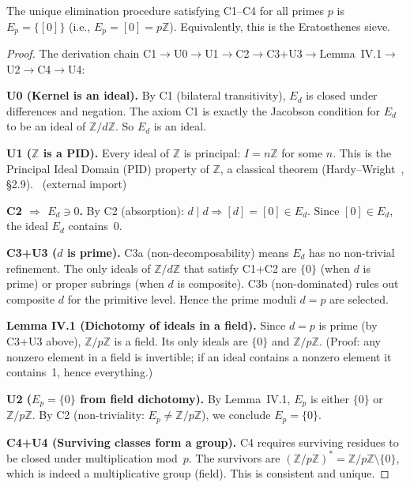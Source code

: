 \documentclass[12pt,a4paper]{article}
\begin{document}
\mTHM
\begin{theorem}
\label{thm:T6_universal}
The unique elimination procedure satisfying C1--C4 for all primes $p$
is $E_p = \{[0]\}$ (i.e., $E_p = [0] = p\mathbb{Z}$). Equivalently,
this is the Eratosthenes sieve.

\begin{proof}
The derivation chain C1$\to$U0$\to$U1$\to$C2$\to$C3+U3$\to$Lemma~IV.1$\to$U2$\to$C4$\to$U4:

\medskip
\textbf{U0 (Kernel is an ideal).}
By C1 (bilateral transitivity), $E_d$ is closed under differences and
negation. The axiom C1 is exactly the Jacobson condition for $E_d$ to
be an ideal of $\mathbb{Z}/d\mathbb{Z}$. So $E_d$ is an ideal. \THMTAG

\textbf{U1 ($\mathbb{Z}$ is a PID).}
Every ideal of $\mathbb{Z}$ is principal: $I = n\mathbb{Z}$ for some $n$.
This is the Principal Ideal Domain (PID) property of $\mathbb{Z}$,
a classical theorem (Hardy--Wright~\cite{HardyWright2008}, \S2.9).
\THMTAG~(external import)

\textbf{C2 $\Rightarrow$ $E_d \ni 0$.}
By C2 (absorption): $d \mid d \Rightarrow [d] = [0] \in E_d$. Since
$[0] \in E_d$, the ideal $E_d$ contains~$0$.

\textbf{C3+U3 ($d$ is prime).}
C3a (non-decomposability) means $E_d$ has no non-trivial refinement.
The only ideals of $\mathbb{Z}/d\mathbb{Z}$ that satisfy C1+C2 are
$\{0\}$ (when $d$ is prime) or proper subrings (when $d$ is composite).
C3b (non-dominated) rules out composite $d$ for the primitive level.
Hence the prime moduli $d = p$ are selected.

\textbf{Lemma IV.1 (Dichotomy of ideals in a field).}
Since $d = p$ is prime (by C3+U3 above), $\mathbb{Z}/p\mathbb{Z}$ is
a field. Its only ideals are $\{0\}$ and $\mathbb{Z}/p\mathbb{Z}$.
(Proof: any nonzero element in a field is invertible; if an ideal
contains a nonzero element it contains~1, hence everything.)

\textbf{U2 ($E_p = \{0\}$ from field dichotomy).}
By Lemma~IV.1, $E_p$ is either $\{0\}$ or $\mathbb{Z}/p\mathbb{Z}$.
By C2 (non-triviality: $E_p \neq \mathbb{Z}/p\mathbb{Z}$), we conclude
$E_p = \{0\}$. \THMTAG

\textbf{C4+U4 (Surviving classes form a group).}
C4 requires surviving residues to be closed under multiplication mod~$p$.
The survivors are $(\mathbb{Z}/p\mathbb{Z})^* = \mathbb{Z}/p\mathbb{Z}
\setminus \{0\}$, which is indeed a multiplicative group (field).
This is consistent and unique.


\end{proof}
\end{theorem}
\end{document}
